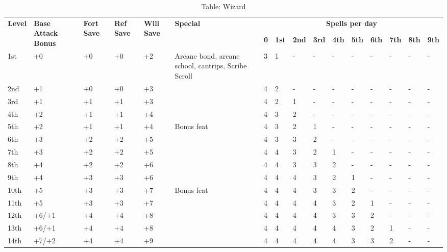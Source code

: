 \begin{table*}[]
\caption{Table: Wizard}
\sffamily
\setlength{\tabcolsep}{1pt}
\begin{tabularx}{\linewidth}{lp{6em}p{2.5em}p{2.5em}p{2.5em}Xllllllllll}
\multirow{2}{*}{\textbf{Level}} & \multirow{2}{*}{\parbox{5em}{\textbf{Base Attack Bonus}}} & \multirow{2}{*}{\parbox{1.5em}{\textbf{Fort Save}}} & \multirow{2}{*}{\parbox{1.5em}{\textbf{Ref Save}}} & \multirow{2}{*}{\parbox{1.5em}{\textbf{Will Save}}} & \textbf{Special}     & \multicolumn{10}{c}{\textbf{Spells per day}} \\
                       &                                    &                            &                           &                            &                                                                                                  &  \textbf{0} & \textbf{1st} & \textbf{2nd} & \textbf{3rd} & \textbf{4th} & \textbf{5th} & \textbf{6th} & \textbf{7th} & \textbf{8th} & \textbf{9th} \\
1st & +0 & +0 & +0 & +2 & Arcane bond, arcane school, cantrips, Scribe Scroll & 3 & 1 & - & - & - & - & - & - & - & -\\
2nd & +1 & +0 & +0 & +3 &  & 4 & 2 & - & - & - & - & - & - & - & -\\
3rd & +1 & +1 & +1 & +3 &  & 4 & 2 & 1 & - & - & - & - & - & - & -\\
4th & +2 & +1 & +1 & +4 &  & 4 & 3 & 2 & - & - & - & - & - & - & -\\
5th & +2 & +1 & +1 & +4 & Bonus feat & 4 & 3 & 2 & 1 & - & - & - & - & - & -\\
6th & +3 & +2 & +2 & +5 &  & 4 & 3 & 3 & 2 & - & - & - & - & - & -\\
7th & +3 & +2 & +2 & +5 &  & 4 & 4 & 3 & 2 & 1 & - & - & - & - & -\\
8th & +4 & +2 & +2 & +6 &  & 4 & 4 & 3 & 3 & 2 & - & - & - & - & -\\
9th & +4 & +3 & +3 & +6 &  & 4 & 4 & 4 & 3 & 2 & 1 & - & - & - & -\\
10th & +5 & +3 & +3 & +7 & Bonus feat & 4 & 4 & 4 & 3 & 3 & 2 & - & - & - & -\\
11th & +5 & +3 & +3 & +7 &  & 4 & 4 & 4 & 4 & 3 & 2 & 1 & - & - & -\\
12th & +6/+1 & +4 & +4 & +8 &  & 4 & 4 & 4 & 4 & 3 & 3 & 2 & - & - & -\\
13th & +6/+1 & +4 & +4 & +8 &  & 4 & 4 & 4 & 4 & 4 & 3 & 2 & 1 & - & -\\
14th & +7/+2 & +4 & +4 & +9 &  & 4 & 4 & 4 & 4 & 4 & 3 & 3 & 2 & - & -\\

\end{tabularx}
\end{table*}
